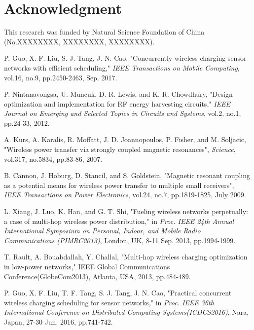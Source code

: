 \documentclass[12pt,journal,onecolumn,draftcls]{IEEEtran}
\begin{document}
\section*{Acknowledgment}
This research was funded by Natural Science Foundation of China (No.XXXXXXXX, XXXXXXXX, XXXXXXXX).

\ifCLASSOPTIONcaptionsoff
  \newpage
\fi


\begin{thebibliography}{11}

P. Guo, X. F. Liu, S. J. Tang, J. N. Cao, "Concurrently wireless charging sensor networks with efficient scheduling," \textit{IEEE Transactions on Mobile Computing}, vol.16, no.9, pp.2450-2463, Sep. 2017.

P. Nintanavongsa, U. Muncuk, D. R. Lewis, and K. R. Chowdhury, "Design optimization and implementation for RF energy harvesting circuits," \textit{IEEE Journal on Emerging and Selected Topics in Circuits and Systems}, vol.2, no.1, pp.24-33, 2012.

A. Kurs, A. Karalis, R. Moffatt, J. D. Joannopoulos, P. Fisher, and M. Soljacic, "Wireless power transfer via strongly coupled magnetic resonances", \textit{Science}, vol.317, no.5834, pp.83-86, 2007.

B. Cannon, J. Hoburg, D. Stancil, and S. Goldstein, "Magnetic resonant coupling as a potential means for wireless power transfer to multiple small receivers", \textit{IEEE Transactions on Power Electronics}, vol.24, no.7, pp.1819-1825, July 2009.

L. Xiang, J. Luo, K. Han, and G. T. Shi, "Fueling wireless networks perpetually: a case of multi-hop wireless power distribution," in \textit{Proc. IEEE 24th Annual International Symposium on Personal, Indoor, and Mobile Radio Communications (PIMRC2013)}, London, UK, 8-11 Sep. 2013, pp.1994-1999.

T. Rault, A. Bouabdallah, Y. Challal, "Multi-hop wireless charging optimization in low-power networks," IEEE Global Communications Conference(GlobeCom2013), Atlanta, USA, 2013, pp.484-489.

P. Guo, X. F. Liu, T. F. Tang, S. J. Tang, J. N. Cao, "Practical concurrent wireless charging scheduling for sensor networks," in \textit{Proc. IEEE 36th International Conference on Distributed Computing Systems(ICDCS2016)}, Nara, Japan, 27-30 Jun. 2016, pp.741-742.


\end{thebibliography}
\end{document}
